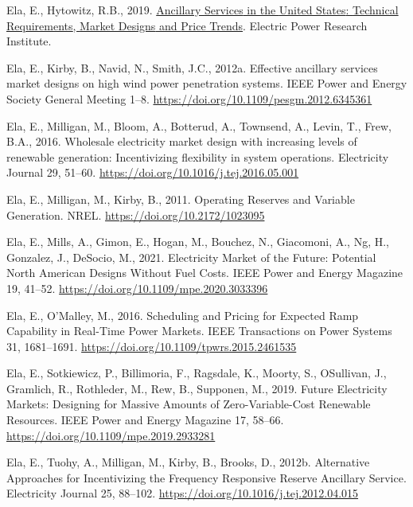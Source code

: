 \documentclass[12pt,a4paper,]{report}
\newlength{\cslhangindent}
\newenvironment{CSLReferences}[2] %
 {%
  \setlength{\parindent}{0pt}
  \ifodd #1 \everypar{\setlength{\hangindent}{\cslhangindent}}\ignorespaces\fi
  \ifnum #2 > 0
  \setlength{\parskip}{#2\baselineskip}
  \fi
 }%
 {}
\begin{document}
\begin{CSLReferences}{1}{0}
\leavevmode{}%
Ela, E., Hytowitz, R.B., 2019.
\href{https://www.epri.com/research/products/000000003002015670}{Ancillary
{Services} in the {United States}: {Technical Requirements}, {Market
Designs} and {Price Trends}}. Electric Power Research Institute.

\leavevmode{}%
Ela, E., Kirby, B., Navid, N., Smith, J.C., 2012a. Effective ancillary
services market designs on high wind power penetration systems. IEEE
Power and Energy Society General Meeting 1--8.
\url{https://doi.org/10.1109/pesgm.2012.6345361}

\leavevmode{}%
Ela, E., Milligan, M., Bloom, A., Botterud, A., Townsend, A., Levin, T.,
Frew, B.A., 2016. Wholesale electricity market design with increasing
levels of renewable generation: {Incentivizing} flexibility in system
operations. Electricity Journal 29, 51--60.
\url{https://doi.org/10.1016/j.tej.2016.05.001}

\leavevmode{}%
Ela, E., Milligan, M., Kirby, B., 2011. Operating {Reserves} and
{Variable Generation}. NREL. \url{https://doi.org/10.2172/1023095}

\leavevmode{}%
Ela, E., Mills, A., Gimon, E., Hogan, M., Bouchez, N., Giacomoni, A.,
Ng, H., Gonzalez, J., DeSocio, M., 2021. Electricity {Market} of the
{Future}: {Potential North American Designs Without Fuel Costs}. IEEE
Power and Energy Magazine 19, 41--52.
\url{https://doi.org/10.1109/mpe.2020.3033396}

\leavevmode{}%
Ela, E., O'Malley, M., 2016. Scheduling and {Pricing} for {Expected Ramp
Capability} in {Real-Time Power Markets}. IEEE Transactions on Power
Systems 31, 1681--1691. \url{https://doi.org/10.1109/tpwrs.2015.2461535}

\leavevmode{}%
Ela, E., Sotkiewicz, P., Billimoria, F., Ragsdale, K., Moorty, S.,
OSullivan, J., Gramlich, R., Rothleder, M., Rew, B., Supponen, M., 2019.
Future {Electricity Markets}: {Designing} for {Massive Amounts} of
{Zero-Variable-Cost Renewable Resources}. IEEE Power and Energy Magazine
17, 58--66. \url{https://doi.org/10.1109/mpe.2019.2933281}

\leavevmode{}%
Ela, E., Tuohy, A., Milligan, M., Kirby, B., Brooks, D., 2012b.
Alternative {Approaches} for {Incentivizing} the {Frequency Responsive
Reserve Ancillary Service}. Electricity Journal 25, 88--102.
\url{https://doi.org/10.1016/j.tej.2012.04.015}


\end{CSLReferences}
\end{document}
